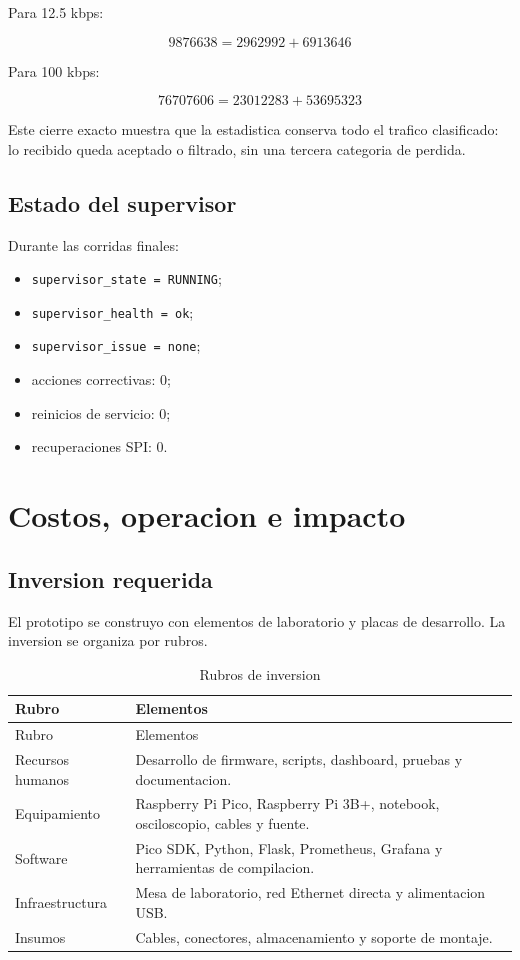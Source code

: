 \documentclass[12pt,a4paper,oneside]{report}
\begin{document}
Para 12.5 kbps:

\begin{equation}
9876638 = 2962992 + 6913646
\end{equation}

Para 100 kbps:

\begin{equation}
76707606 = 23012283 + 53695323
\end{equation}

Este cierre exacto muestra que la estadistica conserva todo el trafico
clasificado: lo recibido queda aceptado o filtrado, sin una tercera categoria
de perdida.

\section{Estado del supervisor}

Durante las corridas finales:

\begin{itemize}
  \item \texttt{supervisor\_state = RUNNING};
  \item \texttt{supervisor\_health = ok};
  \item \texttt{supervisor\_issue = none};
  \item acciones correctivas: 0;
  \item reinicios de servicio: 0;
  \item recuperaciones SPI: 0.
\end{itemize}

\chapter{Costos, operacion e impacto}

\section{Inversion requerida}

El prototipo se construyo con elementos de laboratorio y placas de desarrollo.
La inversion se organiza por rubros.

\begin{longtable}{p{}p{}}
\caption{Rubros de inversion}\\
\toprule
Rubro & Elementos \\
\midrule
\endfirsthead
\toprule
Rubro & Elementos \\
\midrule
\endhead
Recursos humanos & Desarrollo de firmware, scripts, dashboard, pruebas y documentacion. \\
Equipamiento & Raspberry Pi Pico, Raspberry Pi 3B+, notebook, osciloscopio, cables y fuente. \\
Software & Pico SDK, Python, Flask, Prometheus, Grafana y herramientas de compilacion. \\
Infraestructura & Mesa de laboratorio, red Ethernet directa y alimentacion USB. \\
Insumos & Cables, conectores, almacenamiento y soporte de montaje. \\
\bottomrule
\end{longtable}
\end{document}
